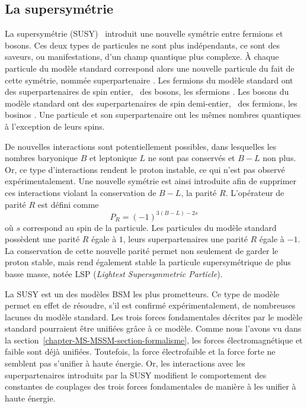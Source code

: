 \subsection{La supersymétrie}\label{chapter-MS-MSSM-section-BSM-subsec-SUSY}
La supersymétrie (SUSY)~\cite{MARTIN_1998} introduit une nouvelle symétrie entre fermions et bosons.
Ces deux types de particules ne sont plus indépendants, ce sont des saveurs, ou manifestations, d'un champ quantique plus complexe.
À chaque particule du modèle standard correspond alors une nouvelle particule du fait de cette symétrie, nommée \og superpartenaire \fg.
Les fermions du modèle standard ont des superpartenaires de spin entier, \ie\ des bosons, les \og sfermions \fg.
Les bosons du modèle standard ont des superpartenaires de spin demi-entier, \ie\ des fermions, les \og bosinos \fg.
Une particule et son superpartenaire ont les mêmes nombres quantiques à l'exception de leurs spins.
\par De nouvelles interactions sont potentiellement possibles, dans lesquelles les nombres baryonique $B$ et leptonique $L$ ne sont pas conservés et $B-L$ non plus.
Or, ce type d'interactions rendent le proton instable, ce qui n'est pas observé expérimentalement.
Une nouvelle symétrie est ainsi introduite afin de supprimer ces interactions violant la conservation de $B-L$, la parité $R$.
L'opérateur de parité $R$ est défini comme
\begin{equation}
P_R = (-1)^{3(B-L)-2s}
\end{equation}
où $s$ correspond au spin de la particule.
Les particules du modèle standard possèdent une parité $R$ égale à $1$, leurs superpartenaires une parité $R$ égale à $-1$.
La conservation de cette nouvelle parité permet non seulement de garder le proton stable, mais rend également stable la particule supersymétrique de plus basse masse, notée LSP (\emph{Lightest Supersymmetric Particle}).
\par La SUSY est un des modèles BSM les plus prometteurs.
Ce type de modèle permet en effet de résoudre, s'il est confirmé expérimentalement, de nombreuses lacunes du modèle standard.
Les trois forces fondamentales décrites par le modèle standard pourraient être unifiées grâce à ce modèle.
Comme nous l'avons vu dans la section~\ref{chapter-MS-MSSM-section-formalisme}, les forces électromagnétique et faible sont déjà unifiées.
Toutefois, la force électrofaible et la force forte ne semblent pas s'unifier à haute énergie.
Or, les interactions avec les superpartenaires introduits par la SUSY modifient le comportement des constantes de couplages des trois forces fondamentales de manière à les unifier à haute énergie.
